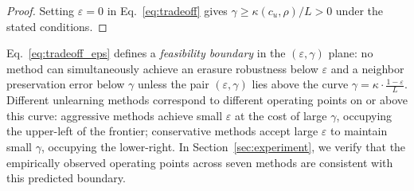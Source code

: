 \begin{proof}
Setting $\varepsilon = 0$ in Eq.~\eqref{eq:tradeoff} gives 
$\gamma \geq \kappa(c_u,\rho)/L > 0$
under the stated conditions.
\end{proof}

Eq.~\eqref{eq:tradeoff_eps} defines a \emph{feasibility boundary} in the $(\varepsilon, \gamma)$ plane: no method can simultaneously achieve an erasure robustness below $\varepsilon$ and a neighbor preservation error below $\gamma$ unless the pair $(\varepsilon, \gamma)$ lies above the curve
$\gamma = \kappa \cdot \frac{1-\varepsilon}{L}.$
Different unlearning methods correspond to different operating points on or above this curve: aggressive methods achieve small $\varepsilon$ at the cost of large $\gamma$, occupying the upper-left of the frontier; conservative methods accept large $\varepsilon$ to maintain small $\gamma$, occupying the lower-right.
In Section~\ref{sec:experiment}, we verify that the empirically observed operating points across seven methods are consistent with this predicted boundary.







